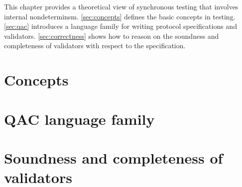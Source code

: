 This chapter provides a theoretical view of synchronous testing that involves
internal nondeterminsm.  \autoref{sec:concepts} defines the basic concepts in
testing.  \autoref{sec:qac} introduces a language family for writing protocol
specifications and validators.  \autoref{sec:correctness} shows how to reason on
the soundness and completeness of validators with respect to the specification.

\section{Concepts}
\label{sec:concepts}


\section{QAC language family}
\label{sec:qac}


\section{Soundness and completeness of validators}
\label{sec:correctness}

